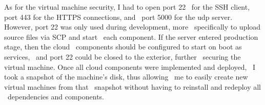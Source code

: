 As for the virtual machine security, I had to open port 22 \
for the SSH client, port 443 for the HTTPS connections, and \
port 5000 for the udp server.
However, port 22 was only used during development, more \
specifically to upload source files via SCP and start \
each component.
If the server entered production stage, then the cloud \
components should be configured to start on boot as services, \
and port 22 could be closed to the exterior, further \
securing the virtual machine.
Once all cloud components were implemented and deployed, \
I took a snapshot of the machine's disk, thus allowing \
me to easily create new virtual machines from that \
snapshot without having to reinstall and redeploy all \
dependencies and components.




%
%
